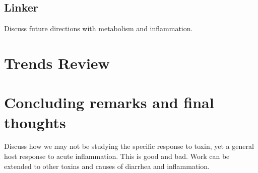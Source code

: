 \subsection{Linker}
Discuss future directions with metabolism and inflammation.

\section{Trends Review}


\section{Concluding remarks and final thoughts}
Discuss how we may not be studying the specific response to toxin,
yet a general host response to acute inflammation. This is good and 
bad. Work can be extended to other toxins and causes of
diarrhea and inflammation.




















